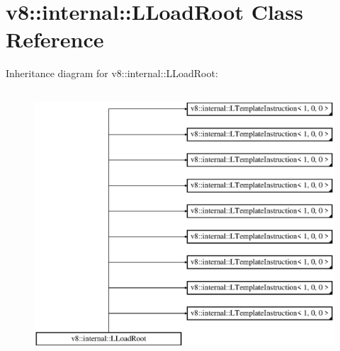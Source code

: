\hypertarget{classv8_1_1internal_1_1_l_load_root}{}\section{v8\+:\+:internal\+:\+:L\+Load\+Root Class Reference}
\label{classv8_1_1internal_1_1_l_load_root}
Inheritance diagram for v8\+:\+:internal\+:\+:L\+Load\+Root\+:\begin{figure}[H]
\begin{center}
\leavevmode
\includegraphics[height=10.000000cm]{classv8_1_1internal_1_1_l_load_root}
\end{center}
\end{figure}
